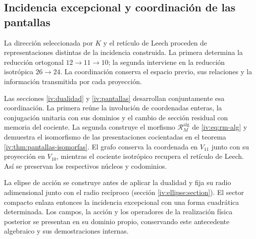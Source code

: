 \subsection{Incidencia excepcional y coordinación de las pantallas}
\label{exc:pantallas-dualidad}

La dirección seleccionada por \(K\) y el retículo de Leech proceden
de representaciones distintas de la incidencia construida. La primera
determina la reducción ortogonal \(12\to11\to10\); la segunda
interviene en la reducción isotrópica \(26\to24\). La coordinación
conserva el espacio previo, sus relaciones y la información transmitida
por cada proyección.

Las secciones \ref{iv:dualidad} y \ref{iv:pantallas} desarrollan
conjuntamente esa coordinación. La primera reúne la involución de
coordenadas enteras, la conjugación unitaria con sus dominios y el
cambio de sección residual con memoria del cociente. La segunda
construye el morfismo \(\mathcal R_M^{\mathrm{alg}}\) de
\eqref{iv:eq:rm-alg} y demuestra el isomorfismo de las presentaciones
cocientadas en el teorema \ref{iv:thm:pantallas-isomorfas}.
El grafo conserva la coordenada en \(V_{11}\) junto con su proyección
en \(V_{10}\), mientras el cociente isotrópico recupera el retículo
de Leech. Así se preservan los respectivos núcleos y codominios.

La elipse de acción se construye antes de aplicar la dualidad y fija
su radio adimensional junto con el radio recíproco
(sección \ref{iv:ellipse:section}). El sector compacto enlaza entonces
la incidencia excepcional con una forma cuadrática determinada. Los
campos, la acción y los operadores de la realización física posterior
se presentan en su dominio propio, conservando este antecedente
algebraico y sus demostraciones internas.

